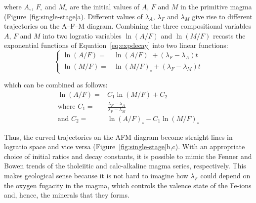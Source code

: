 \documentclass{article}
\begin{document}
\noindent where $A_\circ$, $F_\circ$ and $M_\circ$ are the initial
values of $A$, $F$ and $M$ in the primitive magma
(Figure~\ref{fig:single-stage}a). Different values of $\lambda_A$,
$\lambda_F$ and $\lambda_M$ give rise to different trajectories on the
A--F--M diagram. Combining the three compositional variables $A$, $F$
and $M$ into two logratio variables $\ln(A/F)$ and $\ln(M/F)$ recasts
the exponential functions of Equation~\ref{eq:expdecay} into two
linear functions:
\begin{equation}
\begin{cases}
  \ln(A/F) = & \ln(A/F)_\circ + (\lambda_F-\lambda_A)t\\
  \ln(M/F) = & \ln(M/F)_\circ + (\lambda_F-\lambda_M)t
\end{cases}
\label{eq:simple}
\end{equation}

\noindent which can be combined as follows:
\begin{equation}
  \begin{split}
    \ln(A/F) = & C_1 \ln(M/F) + C_2 \\
    \mbox{where~} C_1 = & \frac{\lambda_F-\lambda_A}{\lambda_F-\lambda_M} \\
    \mbox{and~} C_2 = & \ln(A/F)_\circ - C_1 \ln(M/F)_\circ 
  \end{split}
  \label{eq:linear}
\end{equation}

Thus, the curved trajectories on the AFM diagram become straight lines
in logratio space and vice versa
(Figure~\ref{fig:single-stage}b,c). With an appropriate choice of
initial ratios and decay constants, it is possible to mimic the Fenner
and Bowen trends of the tholeiitic and calc-alkaline magma series,
respectively. This makes geological sense because it is not hard to
imagine how $\lambda_F$ could depend on the oxygen fugacity in the
magma, which controls the valence state of the Fe-ions and, hence, the
minerals that they forms.\medskip
\end{document}
